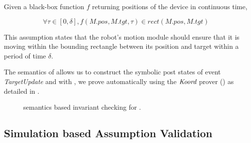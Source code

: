 Given a black-box function $f$ returning positions of the device in continuous time,
\begin{assumption}\label{lineform-assume}
\[
\forall \tau \in [0, \delta], f(M.pos, M.tgt, \tau) \in rect(M.pos, M.tgt)
\]
\end{assumption}
This assumption states that the robot's motion module should ensure that it is moving within the bounding rectangle between its position and target
within a period of time $\delta$.

The \K semantics of \lgname allows us to construct the symbolic post states of event \emph{TargetUpdate} and with , we prove  automatically using the $\emph{Koord}$ prover () as detailed in .

\begin{figure}
\caption{\K semantics based invariant checking for \lgname.}
\label{fig:tools}
\end{figure}

\subsection{Simulation based Assumption Validation}

